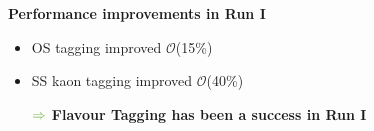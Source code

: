 {\begin{minipage}{0.474\boxwidth}
\begin{center}
\end{center}
\textbf{Performance improvements in Run I}
\begin{itemize}
\setlength\itemsep{0.01em}
\vspace{-0.3em}
\item OS tagging improved $\mathcal{O}$(15\%) 
\item SS kaon tagging improved $\mathcal{O}$(40\%)
\vspace{0.5em}
\setlength{\itemindent}{.14in}
\item[$\color{tu_gruen}\Rightarrow$] \textbf{Flavour Tagging has been a success in Run I}
\end{itemize}
\end{minipage}

}

